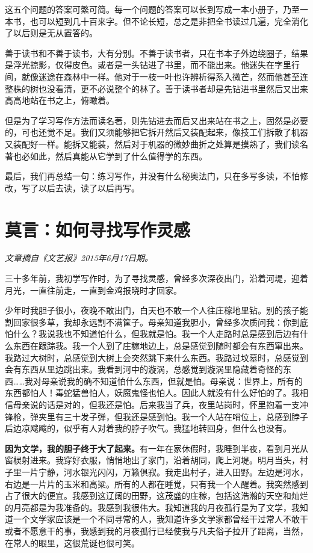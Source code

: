 \documentclass[fontset=fandol,12pt,a5paper]{ctexbook}
\begin{document}
这五个问题的答案可繁可简。每一个问题的答案可以长到写成一本小册子，乃至一本书，也可以短到几十百来字。但不论长短，总之是非把全书读过几遍，完全消化了以后则是无从置答的。

善于读书和不善于读书，大有分别。不善于读书者，只在书本子外边绕圈子，结果是浮光掠影，仅得皮色。或者是一头钻进了书里，而不能出来。他迷失在字里行间，就像迷途在森林中一样。他对于一枝一叶也许辨析得系入微芒，然而他甚至连整株的树也没看清，更不必说整个的林了。善于读书者却是先钻进书里然后又出来高高地站在书之上，俯瞰着。

但是为了学习写作方法而读名著，则先钻进去而后又出来站在书之上，固然是必要的，可也还觉不足。我们又须能够把它拆开然后又装配起来，像技工们拆散了机器又装配好一样。能拆又能装，然后对于机器的微妙曲折之处算是摸熟了，我们读名著也必如此，然后真能从它学到了什么值得学的东西。

最后，我们再总结一句：练习写作，并没有什么秘奥法门，只在多写多读，不怕修改，写了以后去读，读了以后再写。

\newpage

\section{莫言：如何寻找写作灵感}

\emph{文章摘自《文艺报》2015年6月17日期。}
\vspace{2em}

三十多年前，我初学写作时，为了寻找灵感，曾经多次深夜出门，沿着河堤，迎着月光，一直往前走，一直到金鸡报晓时才回家。

少年时我胆子很小，夜晚不敢出门，白天也不敢一个人往庄稼地里钻。别的孩子能割回家很多草，我却永远割不满筐子。母亲知道我胆小，曾经多次质问我：你到底怕什么？我说我也不知道怕什么，但我就是怕。我一个人走路时总是感到后边有什么东西在跟踪我。我一个人到了庄稼地边上，总是感觉到随时都会有东西窜出来。我路过大树时，总感觉到大树上会突然跳下来什么东西。我路过坟墓时，总感觉到会有东西从里边跳出来。我看到河中的漩涡，总感觉到漩涡里隐藏着奇怪的东西……我对母亲说我的确不知道怕什么东西，但就是怕。母亲说：世界上，所有的东西都怕人！毒蛇猛兽怕人，妖魔鬼怪也怕人。因此人就没有什么好怕的了。我相信母亲说的话是对的，但我还是怕。后来我当了兵，夜里站岗时，怀里抱着一支冲锋枪，弹夹里有三十发子弹，但我还是感到怕。我一个人站在哨位上，总感到脖子后边凉飕飕的，似乎有人对着我的脖子吹气。我猛地转回身，但什么也没有。

\textbf{因为文学，我的胆子终于大了起来。}有一年在家休假时，我睡到半夜，看到月光从窗棂射进来。我穿好衣服，悄悄地出了家门，沿着胡同，爬上河堤。明月当头，村子里一片宁静，河水银光闪闪，万籁俱寂。我走出村子，进入田野。左边是河水，右边是一片片的玉米和高粱。所有的人都在睡觉，只有我一个人醒着。我突然感到占了很大的便宜。我感到这辽阔的田野，这茂盛的庄稼，包括这浩瀚的天空和灿烂的月亮都是为我准备的。我感到我很伟大。我知道我的月夜孤行是为了文学，我知道一个文学家应该是一个不同寻常的人，我知道许多文学家都曾经干过常人不敢干或者不愿意干的事，我感到我的月夜孤行已经使我与凡夫俗子拉开了距离，当然，在常人的眼里，这很荒诞也很可笑。
\end{document}

